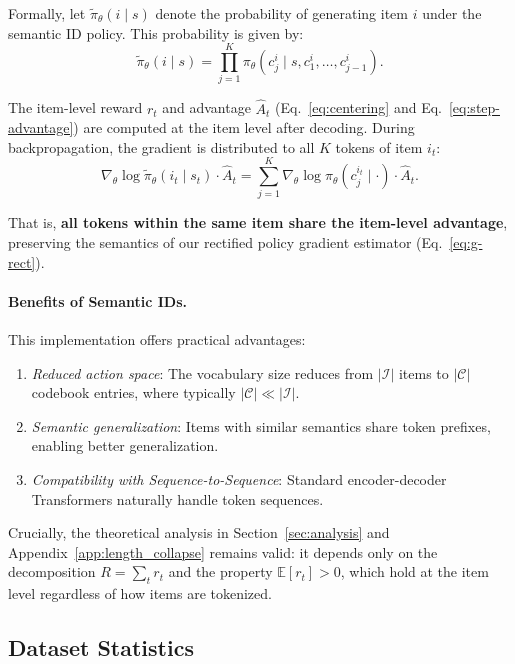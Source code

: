 Formally, let $\tilde{\pi}_\theta(i \mid s)$ denote the probability of generating item $i$ under the semantic ID policy. This probability is given by:
\begin{equation}
\label{eq:semantic_id_prob}
\tilde{\pi}_\theta(i \mid s) = \prod_{j=1}^{K} \pi_\theta(c_j^i \mid s, c_1^i, \ldots, c_{j-1}^i).
\end{equation}

The item-level reward $r_t$ and advantage $\hat{A}_t$ (Eq.~\eqref{eq:centering} and Eq.~\eqref{eq:step-advantage}) are computed at the item level after decoding. During backpropagation, the gradient is distributed to all $K$ tokens of item $i_t$:
\begin{equation}
\label{eq:gradient_distribution}
\nabla_\theta \log \tilde{\pi}_\theta(i_t \mid s_t) \cdot \hat{A}_t = \sum_{j=1}^{K} \nabla_\theta \log \pi_\theta(c_j^{i_t} \mid \cdot) \cdot \hat{A}_t.
\end{equation}

That is, \textbf{all tokens within the same item share the item-level advantage}, preserving the semantics of our rectified policy gradient estimator (Eq.~\eqref{eq:g-rect}).

\paragraph{Benefits of Semantic IDs.} This implementation offers practical advantages:
\begin{enumerate}
    \item \textit{Reduced action space}: The vocabulary size reduces from $|\mathcal{I}|$ items to $|\mathcal{C}|$ codebook entries, where typically $|\mathcal{C}| \ll |\mathcal{I}|$.
    \item \textit{Semantic generalization}: Items with similar semantics share token prefixes, enabling better generalization.
    \item \textit{Compatibility with Sequence-to-Sequence}: Standard encoder-decoder Transformers naturally handle token sequences.
\end{enumerate}

Crucially, the theoretical analysis in Section~\ref{sec:analysis} and Appendix~\ref{app:length_collapse} remains valid: it depends only on the decomposition $R = \sum_t r_t$ and the property $\mathbb{E}[r_t] > 0$, which hold at the item level regardless of how items are tokenized.


\subsection{Dataset Statistics}
\label{app:dataset}

